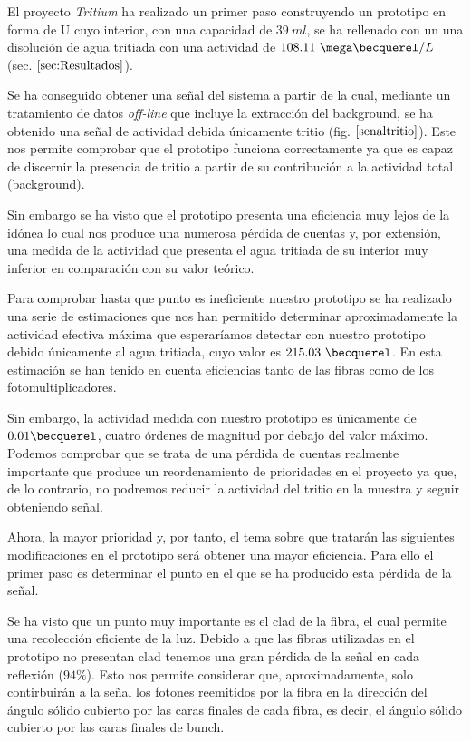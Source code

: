 El proyecto \textit{Tritium} ha realizado un primer paso construyendo un prototipo en forma de U cuyo interior, con una capacidad de $39~ml$, se ha rellenado con un una disolución de agua tritiada con una actividad de $108.11~\mega\becquerel/L$ (sec. $\ref{sec:Resultados}$).

Se ha conseguido obtener una señal del sistema a partir de la cual, mediante un tratamiento de datos \textit{off-line} que incluye la extracción del background, se ha obtenido una señal de actividad debida únicamente tritio (fig. $\ref{senaltritio}$). Este nos permite comprobar que el prototipo funciona correctamente ya que es capaz de discernir la presencia de tritio a partir de su contribución a la actividad total (background).

Sin embargo se ha visto que el prototipo presenta una eficiencia muy lejos de la idónea lo cual nos produce una numerosa pérdida de cuentas y, por extensión, una medida de la actividad que presenta el agua tritiada de su interior muy inferior en comparación con su valor teórico. 

Para comprobar hasta que punto es ineficiente nuestro prototipo se ha realizado una serie de estimaciones que nos han permitido determinar aproximadamente la actividad efectiva máxima que esperaríamos detectar con nuestro prototipo debido únicamente al agua tritiada, cuyo valor es $215.03~\becquerel$. En esta estimación se han tenido en cuenta eficiencias tanto de las fibras como de los fotomultiplicadores. 

Sin embargo, la actividad medida con nuestro prototipo es únicamente de $0.01\becquerel$, cuatro órdenes de magnitud por debajo del valor máximo. Podemos comprobar que se trata de una pérdida de cuentas realmente importante que produce un reordenamiento de prioridades en el proyecto ya que, de lo contrario, no podremos reducir la actividad del tritio en la muestra y seguir obteniendo señal. 

Ahora, la mayor prioridad y, por tanto, el tema sobre que tratarán las siguientes modificaciones en el prototipo será obtener una mayor eficiencia. Para ello el primer paso es determinar el punto en el que se ha producido esta pérdida de la señal. 

Se ha visto que un punto muy importante es el clad de la fibra, el cual permite una recolección eficiente de la luz. Debido a que las fibras utilizadas en el prototipo no presentan clad tenemos una gran pérdida de la señal en cada reflexión ($94\%$). Esto nos permite considerar que, aproximadamente, solo contirbuirán a la señal los fotones reemitidos por la fibra en la dirección del ángulo sólido cubierto por las caras finales de cada fibra, es decir, el ángulo sólido cubierto por las caras finales de bunch. 


